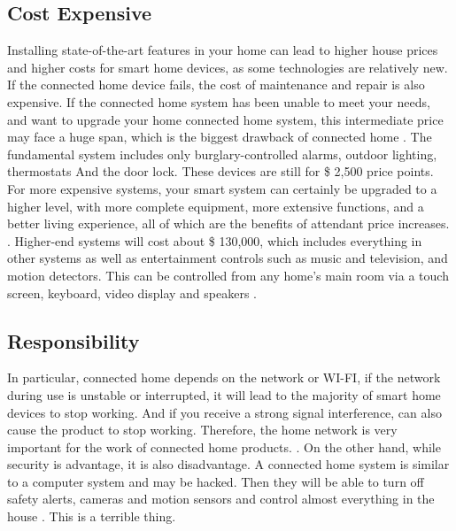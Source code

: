 \documentclass[report]{IEEEtran}
\begin{document}
\subsection{Cost Expensive}
Installing state-of-the-art features in your home can lead to higher house prices and higher costs for smart home devices, as some technologies are relatively new. If the connected home device fails, the cost of maintenance and repair is also expensive. If the connected home system has been unable to meet your needs, and want to upgrade your home connected home system, this intermediate price may face a huge span, which is the biggest drawback of connected home \cite{8}. The fundamental system includes only burglary-controlled alarms, outdoor lighting, thermostats And the door lock. These devices are still for \$ 2,500 price points. For more expensive systems, your smart system can certainly be upgraded to a higher level, with more complete equipment, more extensive functions, and a better living experience, all of which are the benefits of attendant price increases. \cite{8}. Higher-end systems will cost about \$ 130,000, which includes everything in other systems as well as entertainment controls such as music and television, and motion detectors. This can be controlled from any home's main room via a touch screen, keyboard, video display and speakers \cite{8}.

\subsection{Responsibility}
In particular, connected home depends on the network or WI-FI, if the network during use is unstable or interrupted, it will lead to the majority of smart home devices to stop working. And if you receive a strong signal interference, can also cause the product to stop working. Therefore, the home network is very important for the work of connected home products. \cite{4}. On the other hand, while security is advantage, it is also disadvantage. A connected home system is similar to a computer system and may be hacked. Then they will be able to turn off safety alerts, cameras and motion sensors and control almost everything in the house \cite{8} . This is a terrible thing.
\end{document}
